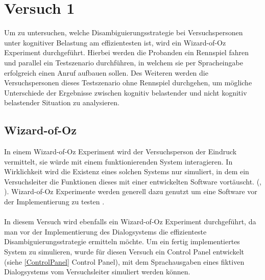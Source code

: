 \documentclass[12pt,a4paper]{scrartcl}
\begin{document}
\section{Versuch 1}
\label{versuch1}
Um zu untersuchen, welche Disambiguierungsstrategie bei Versuchspersonen unter kognitiver Belastung am effizientesten ist, wird ein Wizard-of-Oz Experiment durchgeführt. Hierbei werden die Probanden ein Rennspiel fahren und parallel ein Testszenario durchführen, in welchem sie per Spracheingabe erfolgreich einen Anruf aufbauen sollen. Des Weiteren werden die Versuchspersonen dieses Testszenario ohne Rennspiel durchgehen, um mögliche Unterschiede der Ergebnisse zwischen kognitiv belastender und nicht kognitiv belastender Situation zu analysieren. 
\subsection{Wizard-of-Oz}
\label{WOZ}
In einem Wizard-of-Oz Experiment wird der Versuchsperson der Eindruck vermittelt, sie würde mit einem funktionierenden System interagieren. In Wirklichkeit wird die Existenz eines solchen Systems nur simuliert, in dem ein Versuchsleiter die Funktionen dieses mit einer entwickelten Software vortäuscht.  (\cite{InDe}, \cite{SaLP}). Wizard-of-Oz Experimente werden generell dazu genutzt um eine Software vor der Implementierung zu testen \cite{SaLP}.\\ \\
In diesem Versuch wird ebenfalls ein Wizard-of-Oz Experiment durchgeführt, da man vor der Implementierung des Dialogsystems die effizienteste Disambiguierungsstrategie ermitteln möchte. Um ein fertig implementiertes System zu simulieren, wurde für diesen Versuch ein Control Panel entwickelt (siehe \ref{ControlPanel} Control Panel), mit dem Sprachausgaben eines fiktiven Dialogsystems vom Versuchsleiter simuliert werden können. 
\end{document}
